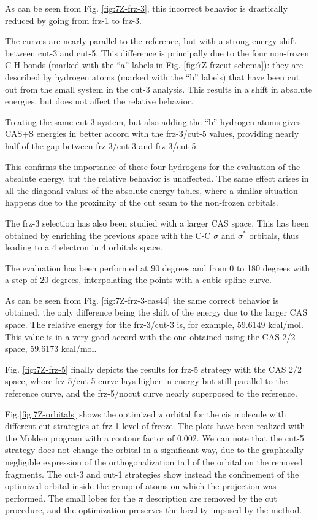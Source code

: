 As can be seen from Fig. \ref{fig:7Z-frz-3}, this incorrect behavior is
drastically reduced by going from frz-1 to frz-3.



The curves are nearly parallel to the reference, but with a strong energy
shift between cut-3 and cut-5.
This difference is principally due to the four non-frozen C-H bonds (marked
with the ``a'' labels in Fig. \ref{fig:7Z-frzcut-schema}): they are
described by hydrogen atoms (marked with the ``b'' labels)
that have been cut out from the small system in the cut-3 analysis. This
results in a shift in absolute energies, but does not affect the relative
behavior.

Treating the same cut-3 system, but also adding the ``b'' hydrogen atoms
gives CAS+S energies in better accord with the frz-3/cut-5 values,
providing nearly half of the gap between frz-3/cut-3 and frz-3/cut-5.

This confirms the importance of these four hydrogens for the evaluation
of the absolute energy, but the relative behavior is unaffected.
The same effect arises in all the diagonal values of the absolute energy
tables, where a similar situation happens due to the proximity of
the cut seam to the non-frozen orbitals.

The frz-3 selection has also been studied with a larger CAS space.
This has been obtained by enriching the previous space with the C-C $\sigma$
and $\sigma^{*}$ orbitals, thus leading to a 4 electron in 4 orbitals space.

The evaluation has been performed at 90 degrees and from 0 to 180 degrees
with a step of 20 degrees, interpolating the points with a cubic spline curve.

As can be seen from Fig. \ref{fig:7Z-frz-3-cas44} the same correct
behavior is obtained, the only difference being the shift of the energy due
to the larger CAS space. The relative energy for the frz-3/cut-3 is, for
example, 59.6149 kcal/mol. This value is in a very good accord with the one
obtained using the CAS 2/2 space, 59.6173 kcal/mol.

Fig. \ref{fig:7Z-frz-5} finally depicts the results for frz-5 strategy with the
CAS 2/2 space, where frz-5/cut-5 curve lays higher in energy but still
parallel to the reference curve, and the frz-5/nocut curve nearly superposed
to the reference. 


Fig.\ref{fig:7Z-orbitals} shows the optimized $\pi$ orbital for the cis
molecule with different cut strategies at frz-1 level of freeze. The plots
have been realized with the Molden program\cite{molden-site} with a contour
factor of 0.002. We can note that the cut-5 strategy does not change the
orbital in a significant way, due to the graphically negligible expression
of the orthogonalization tail of the orbital on the removed fragments.  The
cut-3 and cut-1 strategies show instead the confinement of the optimized
orbital inside the group of atoms on which the projection was performed.
The small lobes for the $\pi$ description are removed by the cut procedure,
and the optimization preserves the locality imposed by the method.

